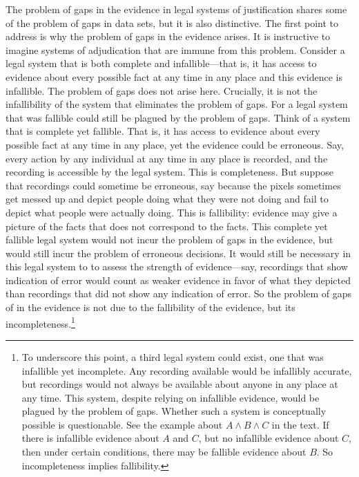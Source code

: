 \documentclass[
  10pt,
  dvipsnames,enabledeprecatedfontcommands]{scrartcl}
\begin{document}
The problem of gaps in the evidence in legal systems of justification
shares some of the problem of gaps in data sets, but it is also
distinctive. The first point to address is why the problem of gaps in
the evidence arises. It is instructive to imagine systems of
adjudication that are immune from this problem. Consider a legal system
that is both complete and infallible---that is, it has access to
evidence about every possible fact at any time in any place and this
evidence is infallible. The problem of gaps does not arise here.
Crucially, it is not the infallibility of the system that eliminates the
problem of gaps. For a legal system that was fallible could still be
plagued by the problem of gaps. Think of a system that is complete yet
fallible. That is, it has access to evidence about every possible fact
at any time in any place, yet the evidence could be erroneous. Say,
every action by any individual at any time in any place is recorded, and
the recording is accessible by the legal system. This is completeness.
But suppose that recordings could sometime be erroneous, say because the
pixels sometimes get messed up and depict people doing what they were
not doing and fail to depict what people were actually doing. This is
fallibility: evidence may give a picture of the facts that does not
correspond to the facts. This complete yet fallible legal system would
not incur the problem of gaps in the evidence, but would still incur the
problem of erroneous decisions. It would still be necessary in this
legal system to to assess the strength of evidence---say, recordings
that show indication of error would count as weaker evidence in favor of
what they depicted than recordings that did not show any indication of
error. So the problem of gaps of in the evidence is not due to the
fallibility of the evidence, but its incompleteness.\footnote{To
  underscore this point, a third legal system could exist, one that was
  infallible yet incomplete. Any recording available would be infallibly
  accurate, but recordings would not always be available about anyone in
  any place at any time. This system, despite relying on infallible
  evidence, would be plagued by the problem of gaps. Whether such a
  system is conceptually possible is questionable. See the example about
  \(A \wedge B \wedge C\) in the text. If there is infallible evidence
  about \(A\) and \(C\), but no infallible evidence about \(C\), then
  under certain conditions, there may be fallible evidence about \(B\).
  So incompleteness implies fallibility.}
\end{document}
